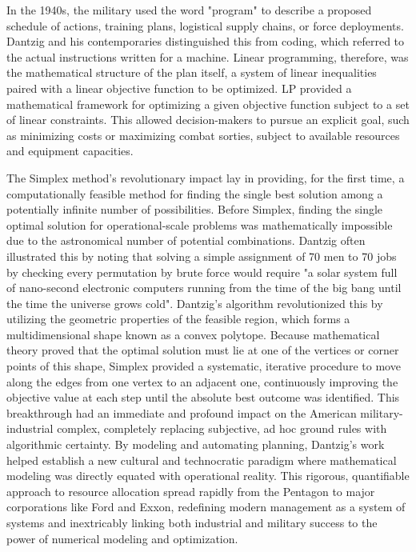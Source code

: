 In the 1940s, the military used the word "program" to describe a proposed schedule of actions, training plans, logistical supply chains, or force deployments. Dantzig and his contemporaries distinguished this from coding, which referred to the actual instructions written for a machine. Linear programming, therefore, was the mathematical structure of the plan itself, a system of linear inequalities paired with a linear objective function to be optimized. LP provided a mathematical framework for optimizing a given objective function subject to a set of linear constraints. This allowed decision-makers to pursue an explicit goal, such as minimizing costs or maximizing combat sorties, subject to available resources and equipment capacities.

The Simplex method's revolutionary impact lay in providing, for the first time, a computationally feasible method for finding the single best solution among a potentially infinite number of possibilities. Before Simplex, finding the single optimal solution for operational-scale problems was mathematically impossible due to the astronomical number of potential combinations. Dantzig often illustrated this by noting that solving a simple assignment of 70 men to 70 jobs by checking every permutation by brute force would require "a solar system full of nano-second electronic computers running from the time of the big bang until the time the universe grows cold". Dantzig's algorithm revolutionized this by utilizing the geometric properties of the feasible region, which forms a multidimensional shape known as a convex polytope. Because mathematical theory proved that the optimal solution must lie at one of the vertices or corner points of this shape, Simplex provided a systematic, iterative procedure to move along the edges from one vertex to an adjacent one, continuously improving the objective value at each step until the absolute best outcome was identified.
This breakthrough had an immediate and profound impact on the American military-industrial complex, completely replacing subjective, ad hoc ground rules with algorithmic certainty. By modeling and automating planning, Dantzig's work helped establish a new cultural and technocratic paradigm where mathematical modeling was directly equated with operational reality. This rigorous, quantifiable approach to resource allocation spread rapidly from the Pentagon to major corporations like Ford and Exxon, redefining modern management as a system of systems and inextricably linking both industrial and military success to the power of numerical modeling and optimization. 


